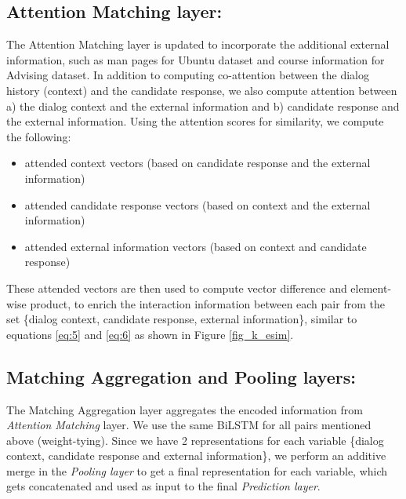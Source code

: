 \documentclass[letterpaper]{article} %
\begin{document}
\subsection{Attention Matching layer:}
The Attention Matching layer is updated to incorporate the additional external information, such as man pages for Ubuntu dataset and course information for Advising dataset. In addition to computing co-attention between the dialog history (context) and the candidate response, we also compute attention between a) the dialog context and the external information and b) candidate response and the external information. Using the attention scores for similarity, we compute the following:
\begin{itemize}
\item attended context vectors (based on candidate response and the external information)
\item attended candidate response vectors (based on context and the external information)
\item attended external information vectors (based on context and candidate response)
\end{itemize}
These attended vectors are then used to compute vector difference and element-wise product, to enrich the interaction information between each pair from the set \{dialog context, candidate response, external information\}, similar to equations \ref{eq:5} and \ref{eq:6} as shown in Figure \ref{fig_k_esim}.

\subsection{Matching Aggregation and Pooling layers:}
The Matching Aggregation layer aggregates the encoded information from \textit{Attention Matching} layer. We use the same BiLSTM for all pairs mentioned above (weight-tying). Since we have 2 representations for each variable \{dialog context, candidate response and external information\}, we perform an additive merge in the \textit{Pooling layer} to get a final representation for each variable, which gets concatenated and used as input to the final \textit{Prediction layer}.
\end{document}

